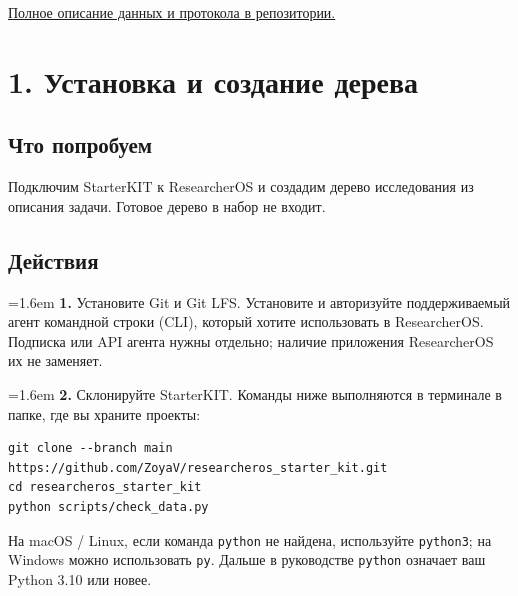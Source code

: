 \documentclass[10pt,a4paper]{article}
\begin{document}
\href{https://github.com/ZoyaV/researcheros_starter_kit/blob/main/data/README.md}{Полное описание данных и протокола в репозитории.}
\clearpage
\section{1. Установка и создание дерева}
\subsection*{Что попробуем}
Подключим StarterKIT к ResearcherOS и создадим дерево исследования из описания задачи. Готовое дерево в набор не входит.

\subsection*{Действия}
\par\noindent\hangindent=1.6em \textbf{1.} Установите Git и Git LFS. Установите и авторизуйте поддерживаемый агент командной строки (CLI), который хотите использовать в ResearcherOS. Подписка или API агента нужны отдельно; наличие приложения ResearcherOS их не заменяет.\par
\par\noindent\hangindent=1.6em \textbf{2.} Склонируйте StarterKIT. Команды ниже выполняются в терминале в папке, где вы храните проекты:\par
\begin{promptbox}
\begin{Verbatim}
git clone --branch main https://github.com/ZoyaV/researcheros_starter_kit.git
cd researcheros_starter_kit
python scripts/check_data.py
\end{Verbatim}
\end{promptbox}
На macOS / Linux, если команда \texttt{python} не найдена, используйте \texttt{python3}; на Windows можно использовать \texttt{py}. Дальше в руководстве \texttt{python} означает ваш Python 3.10 или новее.
\end{document}
